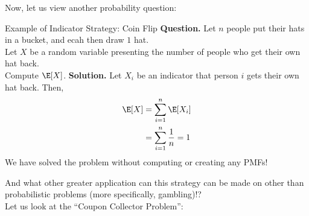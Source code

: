 Now, let us view another probability question:
\begin{ln-explain}{Example of Indicator Strategy: Coin Flip}{}
    \textbf{Question.} Let $n$ people put their hats in a bucket, and ecah then draw $1$ hat. \\
    Let $X$ be a random variable presenting the number of people who get their own hat back. \\
    Compute $\E[X]$.
    \tcblower
    \textbf{Solution.} Let $X_i$ be an indicator that person $i$ gets their own hat back. Then,
    \begin{align*}
        \E[X]
        &= \sum_{i = 1}^n \E[X_i] \\
        &= \sum_{i = 1}^n \frac{1}{n} = 1
    \end{align*}
    We have solved the problem without computing or creating any PMFs!
\end{ln-explain}
And what other greater application can this strategy can be made on other than probabilistic problems (more specifically, gambling)!? \\
Let us look at the ``Coupon Collector Problem'':
